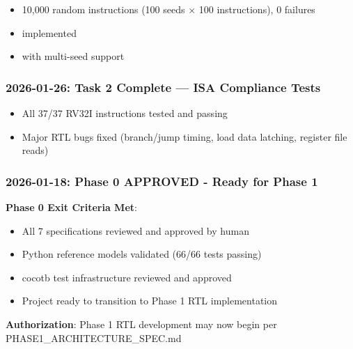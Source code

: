 \begin{record}

\begin{itemize}
\tightlist
\item
  \ok{} 10,000 random instructions (100 seeds × 100 instructions), 0
  failures
\item
  \ok{}  implemented
\item
  \ok{}  with multi-seed
  support
\end{itemize}

\end{record}

\subsubsection{\texorpdfstring{2026-01-26: Task 2 Complete --- ISA
Compliance Tests
\ok{}}{2026-01-26: Task 2 Complete --- ISA Compliance Tests }}\label{cr:status:phase-status:2026-01-26-task-2-complete-isa-compliance-tests-tada}

\begin{record}

\begin{itemize}
\tightlist
\item
  \ok{} All 37/37 RV32I instructions tested and passing
\item
  \ok{} Major RTL bugs fixed (branch/\allowbreak{}jump timing, load data
  latching, register file reads)
\end{itemize}

\end{record}

\subsubsection{\texorpdfstring{2026-01-18: Phase 0 APPROVED - Ready for
Phase 1 \ok{}}{2026-01-18: Phase 0 APPROVED - Ready for Phase 1 }}\label{cr:status:phase-status:2026-01-18-phase-0-approved-ready-for-phase-1-tada}

\begin{record}

\textbf{Phase 0 Exit Criteria Met}:

\begin{itemize}
\tightlist
\item
  \ok{} All 7 specifications reviewed and approved by human
\item
  \ok{} Python reference models validated (66/66 tests passing)
\item
  \ok{} cocotb test infrastructure reviewed and approved
\item
  \ok{} Project ready to transition to Phase 1 RTL implementation
\end{itemize}

\textbf{Authorization}: Phase 1 RTL development may now begin per
PHASE1\_\allowbreak{}ARCHITECTURE\_\allowbreak{}SPEC.md

\end{record}

